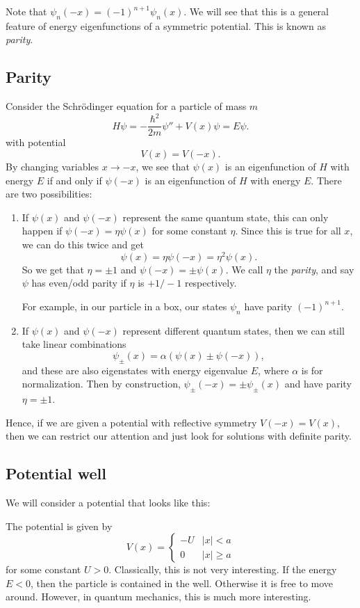 \documentclass[a4paper]{article}
\begin{document}
Note that $\psi_n(-x) = (-1)^{n + 1}\psi_n(x)$. We will see that this is a general feature of energy eigenfunctions of a symmetric potential. This is known as \emph{parity}.
\subsection{Parity}
Consider the Schr\"odinger equation for a particle of mass $m$
\[
  H\psi = -\frac{\hbar^2}{2m}\psi'' + V(x) \psi = E\psi.
\]
with potential
\[
  V(x) = V(-x).
\]
By changing variables $x \to -x$, we see that $\psi(x)$ is an eigenfunction of $H$ with energy $E$ if and only if $\psi(-x)$ is an eigenfunction of $H$ with energy $E$. There are two possibilities:
\begin{enumerate}
  \item If $\psi(x)$ and $\psi(-x)$ represent the same quantum state, this can only happen if $\psi(-x) = \eta \psi(x)$ for some constant $\eta$. Since this is true for all $x$, we can do this twice and get
    \[
      \psi(x) = \eta \psi(-x) = \eta^2 \psi(x).
    \]
    So we get that $\eta = \pm 1$ and $\psi(-x) = \pm \psi(x)$. We call $\eta$ the \emph{parity}, and say $\psi$ has even/odd parity if $\eta$ is $+1/-1$ respectively.

    For example, in our particle in a box, our states $\psi_n$ have parity $(-1)^{n + 1}$.
  \item If $\psi(x)$ and $\psi(-x)$ represent different quantum states, then we can still take linear combinations
    \[
      \psi_\pm (x) = \alpha(\psi(x) \pm \psi(-x)),
    \]
    and these are also eigenstates with energy eigenvalue $E$, where $\alpha$ is for normalization. Then by construction, $\psi_\pm (-x) = \pm \psi_\pm(x)$ and have parity $\eta = \pm 1$.
\end{enumerate}
Hence, if we are given a potential with reflective symmetry $V(-x) = V(x)$, then we can restrict our attention and just look for solutions with definite parity.
\subsection{Potential well}
We will consider a potential that looks like this:
\begin{center}
\end{center}
The potential is given by
\[
  V(x) =
  \begin{cases}
    -U & |x| < a\\
    0 & |x| \geq a
  \end{cases}
\]
for some constant $U > 0$. Classically, this is not very interesting. If the energy $E < 0$, then the particle is contained in the well. Otherwise it is free to move around. However, in quantum mechanics, this is much more interesting.
\end{document}
